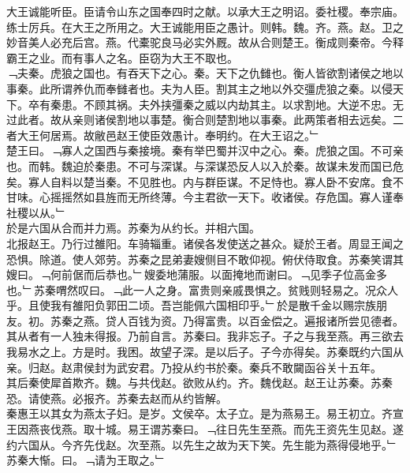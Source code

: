 \documentclass{zhvt-classic}
\begin{document}
\hspace*{2em}大王诚能听臣。臣请令山东之国奉四时之献。以承大王之明诏。委社稷。奉宗庙。练士厉兵。在大王之所用之。大王诚能用臣之愚计。则韩。魏。齐。燕。赵。卫之妙音美人必充后宫。燕。代橐驼良马必实外厩。故从合则楚王。衡成则秦帝。今释霸王之业。而有事人之名。臣窃为大王不取也。\\
\hspace*{2em}﹁夫秦。虎狼之国也。有吞天下之心。秦。天下之仇雠也。衡人皆欲割诸侯之地以事秦。此所谓养仇而奉雠者也。夫为人臣。割其主之地以外交彊虎狼之秦。以侵天下。卒有秦患。不顾其祸。夫外挟彊秦之威以内劫其主。以求割地。大逆不忠。无过此者。故从亲则诸侯割地以事楚。衡合则楚割地以事秦。此两策者相去远矣。二者大王何居焉。故敝邑赵王使臣效愚计。奉明约。在大王诏之。﹂\\
\hspace*{2em}楚王曰。﹁寡人之国西与秦接境。秦有举巴蜀并汉中之心。秦。虎狼之国。不可亲也。而韩。魏迫於秦患。不可与深谋。与深谋恐反人以入於秦。故谋未发而国已危矣。寡人自料以楚当秦。不见胜也。内与群臣谋。不足恃也。寡人卧不安席。食不甘味。心摇摇然如县旌而无所终薄。今主君欲一天下。收诸侯。存危国。寡人谨奉社稷以从。﹂\\
\hspace*{2em}於是六国从合而并力焉。苏秦为从约长。并相六国。\\
\hspace*{2em}北报赵王。乃行过雒阳。车骑辎重。诸侯各发使送之甚众。疑於王者。周显王闻之恐惧。除道。使人郊劳。苏秦之昆弟妻嫂侧目不敢仰视。俯伏侍取食。苏秦笑谓其嫂曰。﹁何前倨而后恭也。﹂嫂委地蒲服。以面掩地而谢曰。﹁见季子位高金多也。﹂苏秦喟然叹曰。﹁此一人之身。富贵则亲戚畏惧之。贫贱则轻易之。况众人乎。且使我有雒阳负郭田二顷。吾岂能佩六国相印乎。﹂於是散千金以赐宗族朋友。初。苏秦之燕。贷人百钱为资。乃得富贵。以百金偿之。遍报诸所尝见德者。其从者有一人独未得报。乃前自言。苏秦曰。我非忘子。子之与我至燕。再三欲去我易水之上。方是时。我困。故望子深。是以后子。子今亦得矣。苏秦既约六国从亲。归赵。赵肃侯封为武安君。乃投从约书於秦。秦兵不敢闚函谷关十五年。\\
\hspace*{2em}其后秦使犀首欺齐。魏。与共伐赵。欲败从约。齐。魏伐赵。赵王让苏秦。苏秦恐。请使燕。必报齐。苏秦去赵而从约皆解。\\
\hspace*{2em}秦惠王以其女为燕太子妇。是岁。文侯卒。太子立。是为燕易王。易王初立。齐宣王因燕丧伐燕。取十城。易王谓苏秦曰。﹁往日先生至燕。而先王资先生见赵。遂约六国从。今齐先伐赵。次至燕。以先生之故为天下笑。先生能为燕得侵地乎。﹂苏秦大惭。曰。﹁请为王取之。﹂\\
\end{document}
